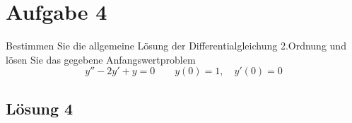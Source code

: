 \documentclass[main.tex]{subfiles}
\begin{document}
\section{Aufgabe 4}
Bestimmen Sie die allgemeine Lösung der Differentialgleichung 2.Ordnung und lösen Sie das gegebene Anfangswertproblem
\begin{equation*}
    y'' - 2y' + y = 0 \qquad y(0)=1, \quad y'(0)=0
\end{equation*}

\subsection{Lösung 4}
\end{document}
